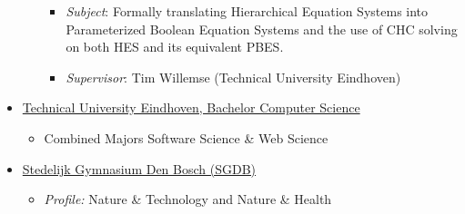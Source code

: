 \documentclass[11pt]{article}
\begin{document}
\begin{itemize}
\begin{itemize}
			\begin{itemize}
				\item \emph{Subject}: Formally translating Hierarchical Equation Systems into Parameterized Boolean Equation Systems and the use of CHC solving on both HES and its equivalent PBES.
				\item \emph{Supervisor}: Tim Willemse (Technical University Eindhoven)
			\end{itemize}
		\end{itemize}
		\item \underline{Technical University Eindhoven, Bachelor Computer Science} \hfill \textit{\color{Blue}{09/2015-07/2018}}
		\begin{itemize}[noitemsep, nolistsep]
			\item Combined Majors Software Science \& Web Science
			\end{itemize}
			\item \underline{Stedelijk Gymnasium Den Bosch (SGDB)} \hfill \textit{\color{Blue}{09/2009-07/2015}}
			\begin{itemize}[noitemsep, nolistsep]
				\item \textit{Profile:} Nature \& Technology and Nature \& Health
			\end{itemize}
		\end{itemize}
\end{document}
